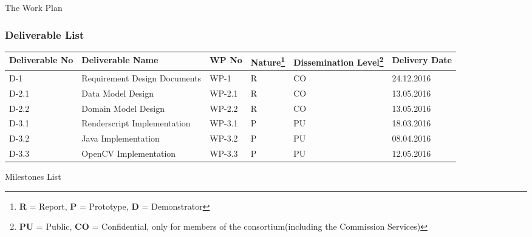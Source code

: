 \documentclass[12pt, a4paper]{article} \pagenumbering{gobble}
\begin{document}
\begin{section}{The Work Plan}
\subsubsection{Deliverable List}
    \begin{tabularx}{\textwidth}{|*{6}{Y|}}
        \hline
      \textbf{Deliverable No} & \textbf{Deliverable Name} & \textbf{WP No} & \textbf{Nature}\footnote{\textbf{R} = Report, \textbf{P} = Prototype, \textbf{D} = Demonstrator} & \textbf{Dissemination Level}\footnote{\textbf{PU} = Public, \textbf{CO} = Confidential, only for members of the consortium(including the Commission Services)} & \textbf{Delivery Date} \\
      \hline
        D-1 & Requirement Design Documents & WP-1 & R & CO & 24.12.2016 \\
        \hline
        D-2.1 & Data Model Design & WP-2.1 & R & CO & 13.05.2016 \\
        \hline
        D-2.2 & Domain Model Design & WP-2.2 & R & CO & 13.05.2016 \\
        \hline
        D-3.1 & Renderscript Implementation & WP-3.1 & P & PU & 18.03.2016 \\
        \hline
        D-3.2 & Java Implementation & WP-3.2 & P & PU & 08.04.2016 \\
        \hline
        D-3.3 & OpenCV Implementation & WP-3.3 & P & PU & 12.05.2016 \\
        \hline
    \end{tabularx}
\begin{subsubsection}{Milestones List}


\end{subsubsection}
\end{section}
\end{document}

